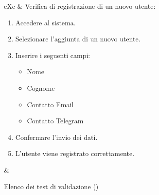\begin{table}[H]
\begin{VTtable}[1.7]{\textwidth}{cXc}
        \addtotv & Verifica di registrazione di un nuovo utente:
        \begin{enumerate}
            \item Accedere al sistema.
            \item Selezionare l'aggiunta di un nuovo utente.
            \item Inserire i seguenti campi:
            \begin{itemize}
                \item Nome
                \item Cognome
                \item Contatto Email
                \item Contatto Telegram
            \end{itemize}
            \item Confermare l'invio dei dati.
            \item L'utente viene registrato correttamente.
        \end{enumerate}
        & \TNI \\
       \bottomrule
	\end{VTtable}
	\caption{Elenco dei test di validazione (\thetableCounter)}
\end{table}

